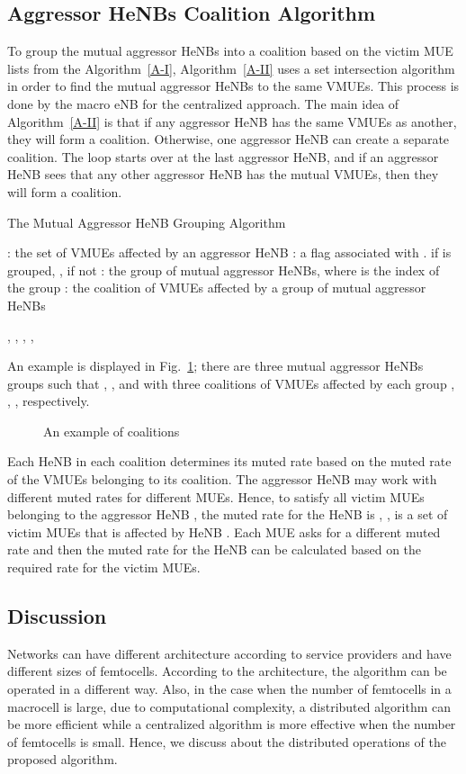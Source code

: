 \documentclass[paper]{ieice}
\begin{document}
\subsection{Aggressor HeNBs Coalition Algorithm}
\label{Femto-Group}
To group the mutual aggressor HeNBs into a coalition based on the victim MUE lists from the Algorithm~\ref{A-I}, Algorithm~\ref{A-II} uses a set intersection algorithm in order to find the mutual aggressor HeNBs to the same VMUEs. This process is done by the  macro eNB for the centralized approach. The main idea of Algorithm~\ref{A-II} is that if any aggressor HeNB has the same VMUEs as another, they will form a coalition. Otherwise, one aggressor HeNB can create a separate coalition. The loop starts over at the last aggressor HeNB, and if an aggressor HeNB sees that any other aggressor HeNB has the mutual VMUEs, then they will form a coalition.
\begin{algorithm}[ht]
\caption{The Mutual Aggressor HeNB Grouping Algorithm}
\label{A-II}
\begin{algorithmic}
\STATE : the set of VMUEs affected by an aggressor HeNB 
\STATE : a flag associated with . if  is grouped, , if not 
\STATE : the group of mutual aggressor HeNBs, where  is the index of the group
\STATE : the coalition of VMUEs affected by a group of mutual aggressor HeNBs 

\IF{}
\STATE , , 
\STATE , , 
\ENDIF
\ENDFOR
\STATE 
\ENDIF
\ENDFOR
\end{algorithmic}
\end{algorithm}

An example is displayed in Fig.~\ref{lb-Sys-Coa}; there are three mutual aggressor HeNBs groups such that , , and  with three coalitions of VMUEs affected by each group , , , respectively.
\begin{figure}[t]
  \centering
\caption{An example of coalitions}\label{lb-Sys-Coa}
\end{figure}

Each HeNB in each coalition determines its muted rate based on the muted rate of the VMUEs belonging to its coalition. The aggressor HeNB may work with different muted rates for different MUEs. Hence, to satisfy all victim MUEs belonging to the aggressor HeNB , the muted rate for the HeNB  is , ,  is a set of victim MUEs that is affected by HeNB . Each MUE asks for a different muted rate and then the muted rate for the HeNB can be calculated based on the required rate for the victim MUEs.

\subsection{Discussion}
\label{Distributed-Al}
Networks can have different architecture according to service providers and have different sizes of femtocells. According to the architecture, the algorithm can be operated in a different way. Also, in the case when the number of femtocells in a macrocell is large, due to computational complexity, a distributed algorithm can be more efficient while a centralized algorithm is more effective when the number of femtocells is small. Hence, we discuss about the distributed operations of the proposed algorithm.
\end{document}
